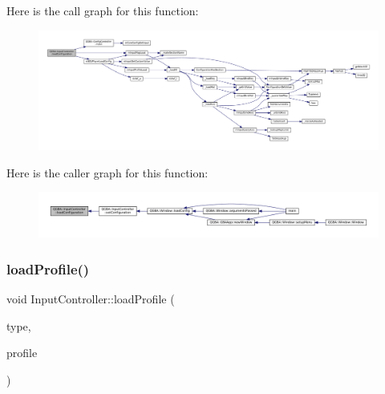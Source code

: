 Here is the call graph for this function\+:
\nopagebreak
\begin{figure}[H]
\begin{center}
\leavevmode
\includegraphics[width=350pt]{class_q_g_b_a_1_1_input_controller_ad008a966ed0e680b06f1883bbfb0829d_cgraph}
\end{center}
\end{figure}
Here is the caller graph for this function\+:
\nopagebreak
\begin{figure}[H]
\begin{center}
\leavevmode
\includegraphics[width=350pt]{class_q_g_b_a_1_1_input_controller_ad008a966ed0e680b06f1883bbfb0829d_icgraph}
\end{center}
\end{figure}
\mbox{\label{class_q_g_b_a_1_1_input_controller_a711e7514a7fb09f023cb388b19fc8fd5}} 
\subsubsection{\texorpdfstring{load\+Profile()}{loadProfile()}}
{\footnotesize\ttfamily void Input\+Controller\+::load\+Profile (\begin{DoxyParamCaption}\item[{uint32\+\_\+t}]{type,  }\item[{const Q\+String \&}]{profile }\end{DoxyParamCaption})}

